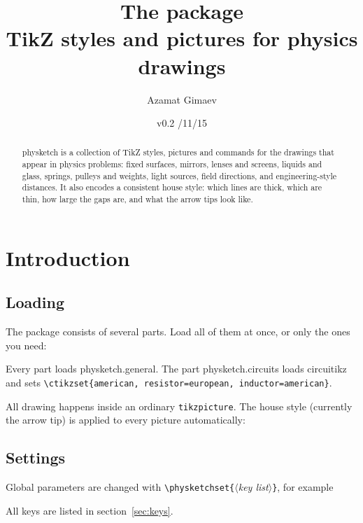 \documentclass[a4paper,11pt]{article}
\title{The \pkg{physketch} package\\[2pt]
  \large TikZ styles and pictures for physics drawings}
\author{Azamat Gimaev}
\date{v0.2 \quad 2026/11/15}
\newcommand\pkg[1]{\textsf{#1}}
\newcommand\cs[1]{\texttt{\textbackslash#1}}
\newcommand\marg[1]{\texttt{\{}\meta{#1}\texttt{\}}}
\newcommand\meta[1]{\ensuremath{\langle}\textit{#1}\ensuremath{\rangle}}
\begin{document}
\maketitle

\begin{abstract}
\pkg{physketch} is a collection of TikZ styles, pictures and commands
for the drawings that appear in physics problems: fixed surfaces, mirrors,
lenses and screens, liquids and glass, springs, pulleys and weights, light
sources, field directions, and engineering-style distances. It also
encodes a consistent house style: which lines are thick, which are thin,
how large the gaps are, and what the arrow tips look like.
\end{abstract}

\tableofcontents

\section{Introduction}

\subsection{Loading}
The package consists of several parts. Load all of them at once, or only
the ones you need:
\begin{code}
\usepackage{physketch}             %
\usepackage{physketch.general}     %
\usepackage{physketch.mechanics}   %
\usepackage{physketch.optics}      %
\usepackage{physketch.circuits}    %
\end{code}
Every part loads \pkg{physketch.general}. The part \pkg{physketch.circuits}
loads \pkg{circuitikz} and sets
\verb|\ctikzset{american, resistor=european, inductor=american}|.

All drawing happens inside an ordinary \texttt{tikzpicture}. The house style
(currently the arrow tip) is applied to every picture automatically:
\begin{example}
\end{example}

\subsection{Settings}
Global parameters are changed with \cs{physketchset}\marg{key list}, for
example
\begin{code}
\end{code}
All keys are listed in section~\ref{sec:keys}.
\end{document}
